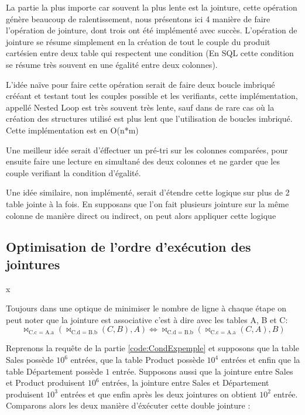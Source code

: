 \documentclass[12pt,a4paper]{article}
\newcommand{\paren}[1]{\left(#1\right)} %
\begin{document}
La partie la plus importe car souvent la plus lente est la jointure, cette opération génère beaucoup de ralentissement, nous présentons ici 4 manière de faire l'opération de jointure, dont trois ont été implémenté avec succès.
L'opération de jointure se résume simplement en la création de tout le couple du produit cartésien entre deux table qui respectent une condition (En SQL cette condition se résume très souvent en une égalité entre deux colonnes). 

L'idée naïve pour faire cette opération serait de faire deux boucle imbriqué crééant et testant tout les couples possible et les verifiants, cette implémentation, appellé Nested Loop est très souvent très lente, sauf dans de rare cas où la création des structures utilisé est plus lent que l'utilisation de boucles imbriqué. Cette implémentation est en O(n*m)

Une meilleur idée serait d'éffectuer un pré-tri sur les colonnes comparées, pour ensuite faire une lecture en simultané des deux colonnes et ne garder que les couple verifiant la condition d'égalité.

Une idée similaire, non implémenté, serait d'étendre cette logique sur plus de 2 table jointe à la fois. En supposans que l'on fait plusieurs jointure sur la même colonne de manière direct ou indirect, on peut alors appliquer cette logique 
\subsection{Optimisation de l'ordre d'exécution des jointures}x

Toujours dans une optique de minimiser le nombre de ligne à chaque étape on peut noter que la jointure est associative c'est à dire avec les tables A, B et C:
\[\Join_{\text{C.c = A.a}} \paren{\Join_{\text{C.d = B.b}}\paren{C,B},A} \Longleftrightarrow \Join_{\text{C.d = B.b}} \paren{\Join_{\text{C.c = A.a}}\paren{C,A},B} \]

Reprenons la requête de la partie \ref{code:CondExpemple} et supposons que la table Sales possède \(10^6\) entrées, que la table Product possède \(10^4\) entrées et enfin que la table Département possède \(1\) entrée.
Supposons aussi que la jointure entre Sales et Product produisent \(10^6\) entrées, la jointure entre Sales et Département produisent \(10^3\) entrées et que enfin après les deux jointures on obtient \(10^2\) entrée.
Comparons alors les deux manière d'éxécuter cette double jointure :
\end{document}
